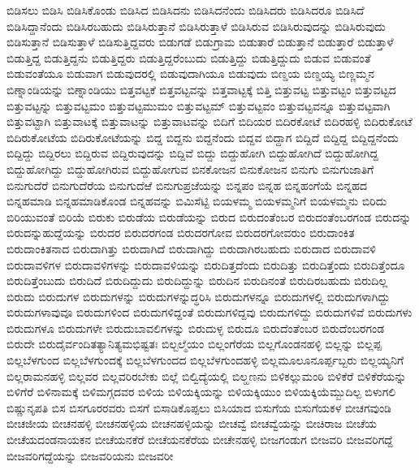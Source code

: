 {ಬಿಡಿಸಲು
ಬಿಡಿಸಿ
ಬಿಡಿಸಿಕೊಂಡು
ಬಿಡಿಸಿದ
ಬಿಡಿಸಿದನು
ಬಿಡಿಸಿದನೆಂದು
ಬಿಡಿಸಿದರು
ಬಿಡಿಸಿದರೂ
ಬಿಡಿಸಿದೆ
ಬಿಡಿಸಿದ್ದಾನೆಂದು
ಬಿಡಿಸಿರಬಹುದು
ಬಿಡಿಸಿರುತ್ತಾನೆ
ಬಿಡಿಸಿರುತ್ತಾಳೆ
ಬಿಡಿಸಿರುವ
ಬಿಡಿಸಿರುವುದನ್ನು
ಬಿಡಿಸಿರುವುದು
ಬಿಡಿಸುತ್ತಾನೆ
ಬಿಡಿಸುತ್ತಾಳೆ
ಬಿಡಿಸುತ್ತಿದ್ದವರು
ಬಿಡುಗಡೆ
ಬಿಡುಗ್ರಾಮ
ಬಿಡುತಾರೆ
ಬಿಡುತ್ತಾನೆ
ಬಿಡುತ್ತಾರೆ
ಬಿಡುತ್ತಾಳೆ
ಬಿಡುತ್ತಿದ್ದ
ಬಿಡುತ್ತಿದ್ದನು
ಬಿಡುತ್ತಿದ್ದರು
ಬಿಡುತ್ತಿದ್ದರೆಂಬುದು
ಬಿಡುತ್ತಿದ್ದು
ಬಿಡುತ್ತಿದ್ದುದು
ಬಿಡುವ
ಬಿಡುವಂತೆ
ಬಿಡುವಂತೆಯೂ
ಬಿಡುವಾಗ
ಬಿಡುವುದರಲ್ಲಿ
ಬಿಡುವುದಾಗಿಯೂ
ಬಿಡುವುದು
ಬಿಣ್ಡಯ
ಬಿಣ್ಡಯ್ಯ
ಬಿಣ್ಣಮ್ಮನ
ಬಿಣ್ನಾಂಡಿಯನ್ನು
ಬಿಣ್ನಾಂಡಿಯು
ಬಿತ್ತವಟ್ಟಕೆ
ಬಿತ್ತವಟ್ಟವನ್ನು
ಬಿತ್ತವಾಟ್ಟಕ್ಕೆ
ಬಿತ್ತಿ
ಬಿತ್ತುವಟ್ಟ
ಬಿತ್ತುವಟ್ಟಂ
ಬಿತ್ತುವಟ್ಟದ
ಬಿತ್ತುವಟ್ಟನ್ನು
ಬಿತ್ತುವಟ್ಟಮಂ
ಬಿತ್ತುವಟ್ಟಮುಮಂ
ಬಿತ್ತುವಟ್ಟಮ್
ಬಿತ್ತುವಟ್ಟವಂ
ಬಿತ್ತುವಟ್ಟವನ್ನೂ
ಬಿತ್ತುವಟ್ಟವಾಗಿ
ಬಿತ್ತುವಟ್ಟಾಗಿ
ಬಿತ್ತುವಾಟಕ್ಕೆ
ಬಿತ್ತುವಾಟನ್ನು
ಬಿತ್ತುವಾಟವನ್ನು
ಬಿದಿಗೆ
ಬಿದಿಯರ
ಬಿದಿರಕೋಟೆ
ಬಿದಿರಹಳ್ಳಿ
ಬಿದಿರುಕೋಟೆ
ಬಿದಿರುಕೋಟೆಯ
ಬಿದಿರುಕೋಟೆಯನ್ನು
ಬಿದ್ದ
ಬಿದ್ದನು
ಬಿದ್ದನೆಂದು
ಬಿದ್ದವ
ಬಿದ್ದಾಗ
ಬಿದ್ದಿದೆ
ಬಿದ್ದಿದ್ದ
ಬಿದ್ದಿದ್ದನೆಂದು
ಬಿದ್ದಿದ್ದು
ಬಿದ್ದಿರಲು
ಬಿದ್ದಿರುವ
ಬಿದ್ದಿರುವುದನ್ನು
ಬಿದ್ದಿವೆ
ಬಿದ್ದು
ಬಿದ್ದುಹೋಗಿ
ಬಿದ್ದುಹೋಗಿದೆ
ಬಿದ್ದುಹೋಗಿದ್ದ
ಬಿದ್ದುಹೋಗಿದ್ದು
ಬಿದ್ದುಹೋಗಿರುವ
ಬಿದ್ದುಹೋಗುವ
ಬಿನಕೋಜನ
ಬಿನುಕೋಜನ
ಬಿನುಗು
ಬಿನುಗುಜಾತಿಗೆ
ಬಿನುಗುದೆರೆ
ಬಿನುಗುದೆರೆಯ
ಬಿನುಗುದೆಱೆ
ಬಿನುಗುಪ್ರಜೆಯನ್ನು
ಬಿನ್ನಪಂ
ಬಿನ್ನಹ
ಬಿನ್ನಹಂಗೆಯೆ
ಬಿನ್ನಹದ
ಬಿನ್ನಹಮಾಡಿ
ಬಿನ್ನಹಮಾಡಿಕೊಂಡ
ಬಿನ್ನಹವನ್ನು
ಬಿಮಿಸೆಟ್ಟಿ
ಬಿಯಳಮ್ಮ
ಬಿಯಳಮ್ಮನಿಗೆ
ಬಿಯಳಮ್ಮನು
ಬಿರಿದು
ಬಿರಿಯುವಂತೆ
ಬಿರಿಯೆ
ಬಿರುಕು
ಬಿರುಡೆಯ
ಬಿರುಡೆಯನ್ನು
ಬಿರುದ
ಬಿರುದಂತೆಂಬರ
ಬಿರುದಂತೆಂಬರಗಂಡ
ಬಿರುದನ್ನು
ಬಿರುದನ್ನುಹುದ್ದೆಯನ್ನು
ಬಿರುದರ
ಬಿರುದರಗಂಡ
ಬಿರುದರಗೋವ
ಬಿರುದರಗೋವರುಂ
ಬಿರುದಾಂಕಿತ
ಬಿರುದಾಂಕಿತನಾದ
ಬಿರುದಾಗಿತ್ತು
ಬಿರುದಾಗಿದೆ
ಬಿರುದಾಗಿದ್ದು
ಬಿರುದಾಗಿರಬಹುದು
ಬಿರುದಾದ
ಬಿರುದಾವಳಿ
ಬಿರುದಾವಳಿಗಳ
ಬಿರುದಾವಳಿಗಳನ್ನು
ಬಿರುದಾವಳಿಯನ್ನು
ಬಿರುದಿತ್ತದೆಂದು
ಬಿರುದಿತ್ತು
ಬಿರುದಿತ್ತೆಂದು
ಬಿರುದಿತ್ತೆಂದೂ
ಬಿರುದಿತ್ತೆಂಬುದು
ಬಿರುದಿದೆ
ಬಿರುದಿದ್ದುದು
ಬಿರುದಿದ್ದುನ್ನು
ಬಿರುದಿನ
ಬಿರುದಿನಂತೆ
ಬಿರುದಿರಬಹುದು
ಬಿರುದಿಲ್ಲ
ಬಿರುದು
ಬಿರುದುಗಳ
ಬಿರುದುಗಳನ್ನು
ಬಿರುದುಗಳನ್ನುದ್ಧರಿಸಿ
ಬಿರುದುಗಳನ್ನೂ
ಬಿರುದುಗಳಲ್ಲಿ
ಬಿರುದುಗಳಾಗಿದ್ದು
ಬಿರುದುಗಳಾವುವೂ
ಬಿರುದುಗಳಿಂದ
ಬಿರುದುಗಳಿದ್ದಂತೆ
ಬಿರುದುಗಳಿದ್ದವು
ಬಿರುದುಗಳಿದ್ದು
ಬಿರುದುಗಳಿವೆ
ಬಿರುದುಗಳು
ಬಿರುದುಗಳೂ
ಬಿರುದುಗಳೇ
ಬಿರುದುಬಾವಲಿಗಳನ್ನು
ಬಿರುದುಳ್ಳ
ಬಿರುದೂ
ಬಿರುದೆಂತೆಂಬರ
ಬಿರುದೆಂಬರಗಂಡ
ಬಿರುದೇ
ಬಿರುದೈರ್ವಂದಿತತ್ಯಾನಿತ್ಯಮಭಿಷ್ಟತಃ
ಬಿಲ್ಬಲ್ಮೆಯಂ
ಬಿಲ್ಲಂಗೆರೆಯ
ಬಿಲ್ಲಗೊಂಡನಹಳ್ಳಿ
ಬಿಲ್ಲನ್ನು
ಬಿಲ್ಲಪ್ಪ
ಬಿಲ್ಲಬೆಳಗುಂದ
ಬಿಲ್ಲಬೆಳಗುಂದಕ್ಕೆ
ಬಿಲ್ಲಬೆಳಗುಂದದ
ಬಿಲ್ಲಬೆಳಗುಂದಹಳ್ಳಿ
ಬಿಲ್ಲಮೂಲೂನೂರ್ಪ್ಪಬ್ಬರು
ಬಿಲ್ಲಯ್ಯನಿಗೆ
ಬಿಲ್ಲರಾಮನಹಳ್ಳಿ
ಬಿಲ್ಲವರ
ಬಿಲ್ಲವರಿರಬೇಕು
ಬಿಲ್ಲೆ
ಬಿಲ್ವಿದ್ಯೆಯಲ್ಲಿ
ಬಿಲ್ಹಣನು
ಬಿಳಿಕಲ್ಲುಮಂಠಿ
ಬಿಳಿಕೆರೆ
ಬಿಳಿಕೆರೆಯನ್ನು
ಬಿಳಿಗೆರೆ
ಬಿಳಿನಾಮಕ್ಕೆ
ಬಿಳಿಮಗ್ಗದವರ
ಬಿಳಿಯ
ಬಿಳಿಯಕ್ಕಿಯನ್ನು
ಬಿಳಿಯಕ್ಕಿಯುಂ
ಬಿಳಿಯಕ್ಕಿಯೆಮ್ಬುದಿಲ್ಪ
ಬಿಳುಗಲಿ
ಬಿಷ್ಣುನೃಪತಿ
ಬಿಸ
ಬಿಸಗೂರರವರು
ಬಿಸಗೆ
ಬಿಸಾಡಿಕೊಪ್ಪಲು
ಬಿಸಿಯಾದ
ಬಿಸುಗೆಯ
ಬಿಸುಗೆಯಕಳ
ಬೀಚಗವುಂಡಿ
ಬೀಚಜೀಯ
ಬೀಚನಹಳ್ಳಿ
ಬೀಚನಹಳ್ಳಿಯ
ಬೀಚನಹಳ್ಳಿಯನ್ನು
ಬೀಚವ್ವೆ
ಬೀಚವ್ವೆಯನ್ನು
ಬೀಚಿರಾಜ
ಬೀಚೆಯ
ಬೀಚೆಯದಂಡನಾಯಕನ
ಬೀಚೆಯನಕೆರೆ
ಬೀಚೆಯನಕೆರೆಯ
ಬೀಚೇನಹಳ್ಳಿ
ಬೀಜಗಂಡುಗ
ಬೀಜವರಿ
ಬೀಜವರಿಗದ್ದೆ
ಬೀಜವರಿಗದ್ದೆಯನ್ನು
ಬೀಜವರಿಯನು
ಬೀಜವರೀ
}

